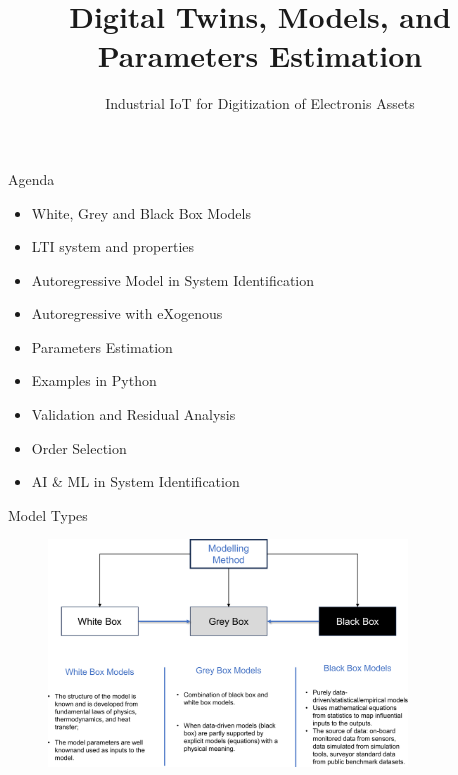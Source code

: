 \documentclass[aspectratio=169,hyperref={pdfpagelabels=false}]{beamer}
\subtitle{\normalsize{Industrial IoT for Digitization of Electronis Assets}}
\title{Digital Twins, Models, and Parameters Estimation}
\begin{document}
\inserttitlepage

\begin{frame}{Agenda}
  \begin{itemize}
    \item White, Grey and Black Box Models
    \item LTI system and properties
    \item Autoregressive Model in System Identification
    \item Autoregressive with eXogenous 
    \item Parameters Estimation
    \item Examples in Python 
    \item Validation and Residual Analysis
    \item Order Selection
    \item AI \& ML in System Identification
  \end{itemize}
\end{frame}

\begin{frame}{Model Types}
  \begin{figure}[t]
    \centering
    \includegraphics[width=0.85\textwidth]{img/modelling_methods.pdf}
\end{figure}
\end{frame}
\end{document}
